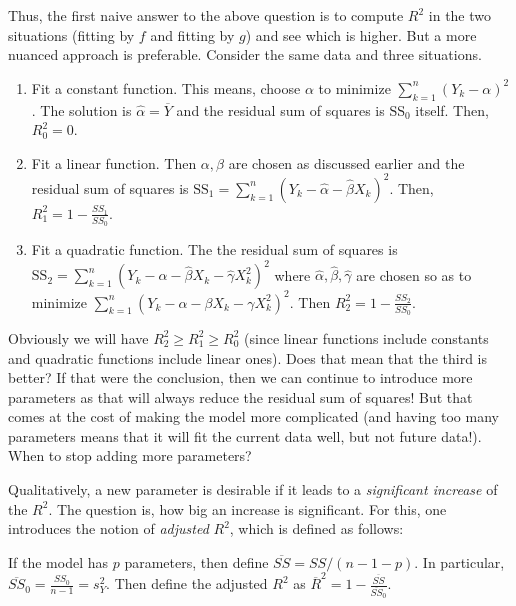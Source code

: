 \documentclass[preprint,  11pt]{amsart}
\theoremstyle{plain} %
\theoremstyle{definition} %
\begin{document}
Thus, the first naive answer to the above question is to compute $R^{2}$ in the two situations (fitting by $f$ and fitting by $g$) and see which is higher. But a more nuanced approach is preferable. Consider the same data and three situations.
\begin{enumerate}\setlength\itemsep{6pt}
\item Fit a constant function. This means, choose  $\alpha$  to minimize $\sum_{k=1}^{n}(Y_{k}-\alpha)^{2}$. The solution is $\hat{\alpha}=\overline{Y}$ and the residual sum of squares is $\mbox{SS}_{0}$ itself. Then, $R_{0}^{2}=0$. 
\item Fit a linear function. Then $\alpha,\beta$ are chosen as discussed earlier and the residual sum of squares is $\mbox{SS}_{1}=\sum_{k=1}^{n}(Y_{k}-\hat{\alpha}-\hat{\beta}X_{k})^{2}$. Then, $R_{1}^{2}=1-\frac{SS_{1}}{SS_{0}}$. 
\item Fit a quadratic function. The the residual sum of squares is $\mbox{SS}_{2}=\sum_{k=1}^{n}(Y_{k}-\hat{\alpha}-\hat{\beta}X_{k}-\hat{\gamma}X_{k}^{2})^{2}$ where  $\hat{\alpha},\hat{\beta},\hat{\gamma}$ are chosen so as to minimize $\sum_{k=1}^{n}(Y_{k}-\alpha-\beta X_{k}-\gamma X_{k}^{2})^{2}$. Then $R_{2}^{2}=1-\frac{SS_{2}}{SS_{0}}$.
\end{enumerate}
Obviously we will have $R_{2}^{2}\ge R_{1}^{2}\ge R_{0}^{2}$ (since linear functions include constants and quadratic functions include linear ones). Does that mean that the third is better? If that were the conclusion, then we can continue to introduce more parameters as that will always reduce the residual sum of squares! But that comes at the cost of making the model more complicated (and having too many parameters means that it will fit the current data well, but not future data!). When to stop adding more parameters?

Qualitatively,  a new parameter is desirable  if it leads to a  {\em significant increase} of the $R^{2}$. The question is, how big an increase is significant. For this, one introduces the notion of {\em adjusted} $R^{2}$, which is defined as follows:

If the model has $p$ parameters, then define $\overline{SS}=SS/(n-1-p)$. In particular, $\overline{SS}_{0}=\frac{SS_{0}}{n-1}=s_{Y}^{2}$.  Then define the adjusted $R^{2}$ as $\overline{R}^{2}=1-\frac{\overline{SS}}{\overline{SS}_{0}}$. 
\end{document}
